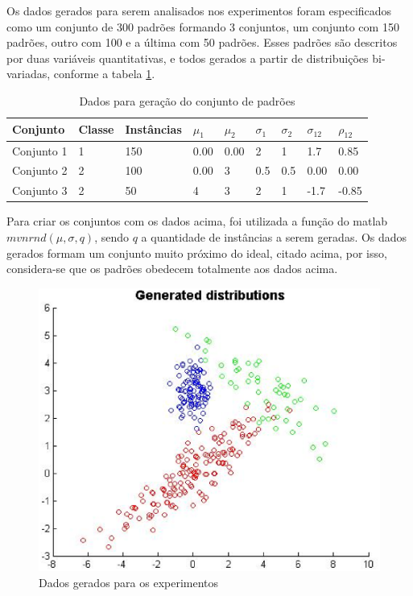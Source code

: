 

Os dados gerados para serem analisados nos experimentos foram especificados como um conjunto de 300 padrões formando 3 conjuntos, um conjunto com 150 padrões, outro com 100 e a última com 50 padrões. Esses padrões são descritos por duas variáveis quantitativas, e todos gerados a partir de distribuições bi-variadas, conforme a tabela \ref{tab:dados}.

\begin{table}[H]
\begin{center}
\begin{tabular}{|l|l|l|l|l|l|l|l|l|}
\hline
Conjunto 				& 	Classe	&	Instâncias	&	$\mu_1$	&	$\mu_2$	&	$\sigma_1$	&	$\sigma_2$	&	$\sigma_{12}$	&	$\rho_{12}$	\\
\hline %
Conjunto 1           	&	1		&  		150		&	0.00   	&   0.00    &   	2   	&		1   	&		1.7		&		0.85	\\
Conjunto 2     			&   2		&   	100		&	0.00	&   3		&   	0.5		&   	0.5   	&		0.00	&		0.00	\\
Conjunto 3     			&   2		&   	50		&	4		&   3		&   	2		&   	1   	&		-1.7	&		-0.85	\\
\hline
\end{tabular}%
\end{center}   %
\caption{Dados para geração do conjunto de padrões}
\label{tab:dados}
\end{table}

Para criar os conjuntos com os dados acima, foi utilizada a função do matlab $mvnrnd(\mu, \sigma, q)$, sendo $q$ a quantidade de instâncias a serem geradas. Os dados gerados formam um conjunto muito próximo do ideal, citado acima, por isso, considera-se que os padrões obedecem totalmente aos dados acima.

\begin{figure}[H]
\center
\includegraphics[scale=0.60]{imagens/tecnicas/generatedDistributions.eps}
\caption{Dados gerados para os experimentos}
\label{fig:dados}
\end{figure}


